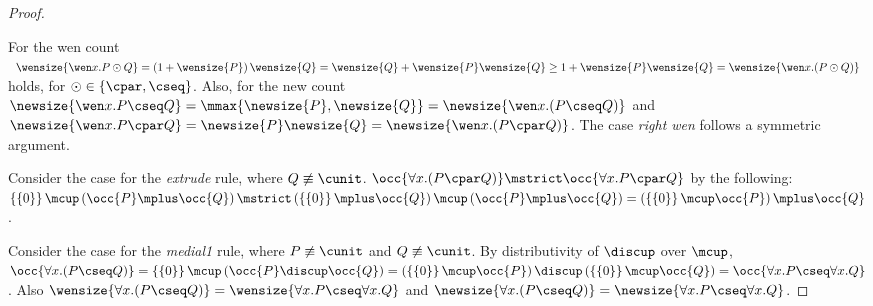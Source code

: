 \documentclass[UKenglish,acmsmall,authorversion]{acmart}
\theoremstyle{plain}
\begin{document}
\begin{proof}
\begin{itemize}
\end{itemize}
For the wen count 
$
\begin{array}{rl}
\wensize{ \wen x. P \odot Q }
=
\left(1 + \wensize{ P }\right)\wensize{ Q }
=
\wensize{Q} + \wensize{P}\wensize{ Q }
\geq
1 + \wensize{ P }\wensize{ Q }
=
\wensize{ \mathopen{\wen x.} \left( P \odot Q \right) }
\end{array}
$ holds, for $\odot \in \left\{\cpar, \cseq \right\}$.
Also, for the new count 
$\newsize{ \wen x. P \cseq Q } = \mmax{\newsize{ P }, \newsize{ Q}} = \newsize{ \mathopen{\wen x.} \left( P \cseq Q \right) }$ and
$\newsize{ \wen x. P \cpar Q } = \newsize{ P }\newsize{ Q } = \newsize{ \mathopen{\wen x.} \left( P \cpar Q \right) }$.
The case \textit{right wen} follows a symmetric argument.



Consider the case for the \textit{extrude} rule, where $Q \not\equiv \cunit$.
$\occ{ \mathopen{\forall x.} \left( P \cpar Q \right) } \mstrict \occ{ \forall x. P \cpar Q }$ by the following:
$
 \left\{\left\{0\right\}\right\} \mcup \left( \occ{ P } \mplus \occ{ Q } \right)
\mstrict
 \left(\left\{\left\{0\right\}\right\} \mplus \occ{ Q } \right) \mcup \left( \occ{ P } \mplus \occ{ Q } \right)
=
 \left( \left\{\left\{0\right\}\right\} \mcup \occ{ P } \right) \mplus \occ{ Q }
$.



Consider the case for the \textit{medial1} rule, where $P \not\equiv \cunit$ and $Q \not\equiv\cunit$.
By distributivity of $\discup$ over $\mcup$,
$
\occ{ \mathopen{\forall x.} \left( P \cseq Q \right) }
=
\left\{\left\{ 0 \right\}\right\} \mcup \left( \occ{ P } \discup \occ{ Q } \right)
=
\left( \left\{\left\{ 0 \right\}\right\} \mcup \occ{ P } \right) \discup \left( \left\{\left\{ 0 \right\}\right\} \mcup \occ{ Q } \right)
=
\occ{ \forall x. P \cseq \forall x. Q }
$.
Also $\wensize{ \mathopen{\forall x.} \left( P \cseq Q \right) } = \wensize{ \forall x. P \cseq \forall x. Q }$
and $\newsize{ \mathopen{\forall x.} \left( P \cseq Q \right) } = \newsize{ \forall x. P \cseq \forall x. Q }$.




\end{proof}
\end{document}

